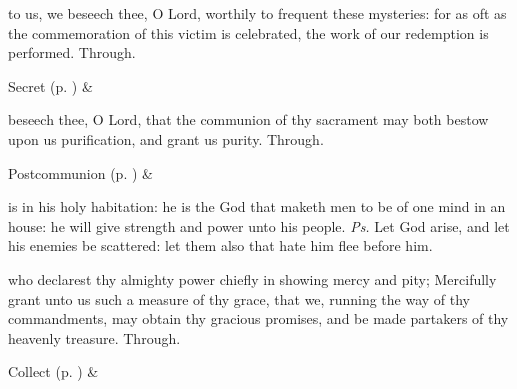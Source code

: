 \secret
{} to us, we beseech thee, O Lord, worthily to frequent these mysteries: for as oft as the commemoration of this victim is celebrated, the work of our redemption is performed. Through.
\begin{rubric}
     Secret  (p. \pageref{SPSaints}) \&  
\end{rubric}


\postcommunion
{} beseech thee, O Lord, that the communion of thy sacrament may both bestow upon us purification, and grant us purity. Through.


\begin{rubric}
     Postcommunion  (p. \pageref{SPSaints}) \&  
\end{rubric}


\clearpage
{}


\introit
{} is in his holy habitation: he is the God that maketh men to be of one mind in an house: he will give strength and power unto his people. \textit{Ps.} Let God arise, and let his enemies be scattered: let them also that hate him flee before him.

\collect
{} who declarest thy almighty power chiefly in showing mercy and pity; Mercifully grant unto us such a measure of thy grace, that we, running the way of thy commandments, may obtain thy gracious promises, and be made partakers of thy heavenly treasure. Through.
\begin{rubric}
     Collect  (p. \pageref{SPSaints}) \&  
\end{rubric}

